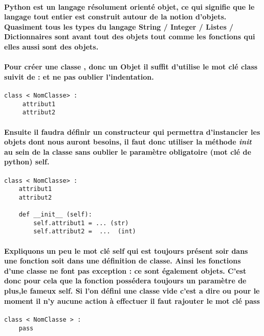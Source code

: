 \documentclass[a4paper, 12pt, twoside]{article}
\begin{document}
\paragraph{ Python est un langage résolument orienté objet, ce qui signifie que le langage tout entier est construit autour de la notion d’objets. Quasiment tous les types du langage String / Integer / Listes / Dictionnaires  sont avant tout des objets tout comme les fonctions
qui elles aussi sont des objets.}

\paragraph{ Pour créer une classe , donc un Objet il suffit d'utilise le mot clé class suivit de  :  et ne pas oublier l'indentation.}
\begin{verbatim}
class < NomClasse> : 
     attribut1
     attribut2 
\end{verbatim}

\paragraph{Ensuite il faudra définir un constructeur qui permettra d'instancier les objets dont nous auront besoins, il faut donc utiliser la méthode  \textit{init} au sein de la classe sans oublier le paramètre obligatoire (mot clé de python) self. }

\begin{verbatim}
class < NomClasse> : 
    attribut1
    attribut2 

    def __init__ (self):
        self.attribut1 = ... (str)
        self.attribut2 =  ...  (int)
\end{verbatim}
\paragraph{Expliquons un peu le mot clé self qui est toujours présent soir dans une fonction soit dans une définition de classe. Ainsi les fonctions d’une classe ne font pas exception : ce sont également objets. C'est donc pour cela que la fonction possédera toujours un paramètre de plus,le fameux self.  Si l'on défini une classe vide c'est a dire ou pour le moment il n'y aucune action à effectuer il faut rajouter le mot clé pass}
\begin{verbatim}
class < NomClasse > : 
    pass 
\end{verbatim}
\end{document}
